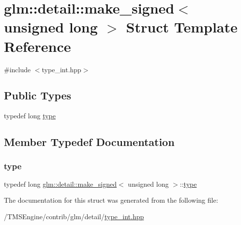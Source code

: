 \hypertarget{structglm_1_1detail_1_1make__signed_3_01unsigned_01long_01_4}{}\section{glm\+:\+:detail\+:\+:make\+\_\+signed$<$ unsigned long $>$ Struct Template Reference}
\label{structglm_1_1detail_1_1make__signed_3_01unsigned_01long_01_4}


{\ttfamily \#include $<$type\+\_\+int.\+hpp$>$}

\subsection*{Public Types}
\begin{DoxyCompactItemize}
\item 
typedef long \hyperlink{structglm_1_1detail_1_1make__signed_3_01unsigned_01long_01_4_a055abdf7ba75d133a9784c2749f2336f}{type}
\end{DoxyCompactItemize}


\subsection{Member Typedef Documentation}
\mbox{\label{structglm_1_1detail_1_1make__signed_3_01unsigned_01long_01_4_a055abdf7ba75d133a9784c2749f2336f}} 
\subsubsection{\texorpdfstring{type}{type}}
{\footnotesize\ttfamily typedef long \hyperlink{structglm_1_1detail_1_1make__signed}{glm\+::detail\+::make\+\_\+signed}$<$ unsigned long $>$\+::\hyperlink{structglm_1_1detail_1_1make__signed_3_01unsigned_01long_01_4_a055abdf7ba75d133a9784c2749f2336f}{type}}



The documentation for this struct was generated from the following file\+:\begin{DoxyCompactItemize}
\item 
/\+T\+M\+S\+Engine/contrib/glm/detail/\hyperlink{type__int_8hpp}{type\+\_\+int.\+hpp}\end{DoxyCompactItemize}
